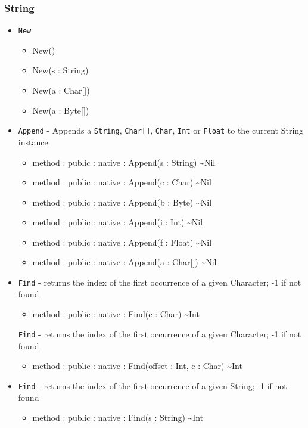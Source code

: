 \documentclass[12pt]{article}
\begin{document}
\subsubsection{String}
\begin{itemize}
\item \texttt{New}
  \begin{itemize}
  \item New()
  \item New(s : String)
  \item New(a : Char[])
  \item New(a : Byte[])
  \end{itemize}
\item \texttt{Append} - Appends a \texttt{String}, \texttt{Char[]},
  \texttt{Char}, \texttt{Int} or \texttt{Float} to the current String
  instance
  \begin{itemize}
  \item method : public : native : Append(s : String) \textasciitilde Nil
  \item method : public : native : Append(c : Char) \textasciitilde Nil
  \item method : public : native : Append(b : Byte) \textasciitilde Nil
  \item method : public : native : Append(i : Int) \textasciitilde Nil
  \item method : public : native : Append(f : Float) \textasciitilde Nil
  \item method : public : native : Append(a : Char[]) \textasciitilde Nil
  \end{itemize}
\item \texttt{Find} - returns the index of the first occurrence of a
  given Character; -1 if not found
  \begin{itemize}
  \item method : public : native : Find(c : Char) \textasciitilde Int
  \end{itemize}
  \texttt{Find} - returns the index of the first occurrence of a given
  Character; -1 if not found
  \begin{itemize}
  \item method : public : native : Find(offset : Int, c : Char) \textasciitilde Int
  \end{itemize}
\item \texttt{Find} - returns the index of the first occurrence of a
  given String; -1 if not found
  \begin{itemize}
  \item method : public : native : Find(s : String) \textasciitilde Int

\end{itemize}
\end{itemize}
\end{document}
